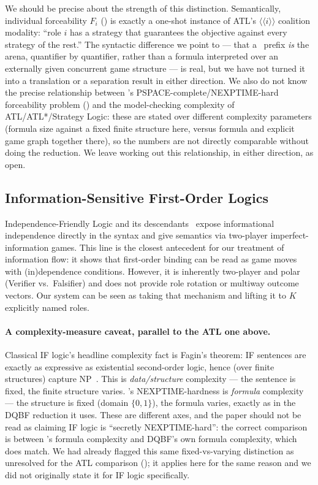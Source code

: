 We should be precise about the strength of this distinction. Semantically, individual forceability $F_i$ () is exactly a one-shot instance of ATL's $\langle\!\langle i \rangle\!\rangle$ coalition modality: ``role $i$ has a strategy that guarantees the objective against every strategy of the rest.'' The syntactic difference we point to --- that a \KFOL\ prefix \emph{is} the arena, quantifier by quantifier, rather than a formula interpreted over an externally given concurrent game structure --- is real, but we have not turned it into a translation or a separation result in either direction. We also do not know the precise relationship between \KFOL's PSPACE-complete/NEXPTIME-hard forceability problem () and the model-checking complexity of ATL/ATL*/Strategy Logic: these are stated over different complexity parameters (formula size against a fixed finite structure here, versus formula and explicit game graph together there), so the numbers are not directly comparable without doing the reduction. We leave working out this relationship, in either direction, as open.

\subsection{Information-Sensitive First-Order Logics}
Independence-Friendly Logic and its descendants~\cite{HintikkaSandu1989,Hintikka1996POMR,MannSanduSevenster2011IFL,sep-logic-if} expose informational independence directly in the syntax and give semantics via two-player imperfect-information games.
This line is the closest antecedent for our treatment of information flow: it shows that first-order binding can be read as game moves with (in)dependence conditions.
However, it is inherently two-player and polar (Verifier vs.\ Falsifier) and does not provide role rotation or multiway outcome vectors.
Our system can be seen as taking that mechanism and lifting it to $K$ explicitly named roles.

\paragraph{A complexity-measure caveat, parallel to the ATL one above.}
Classical IF logic's headline complexity fact is Fagin's theorem: IF sentences
are exactly as expressive as existential second-order logic, hence (over
finite structures) capture NP~\cite{Fagin1974GeneralizedSpectra,sep-logic-if}.
This is \emph{data/structure} complexity --- the sentence is fixed, the
finite structure varies. 's NEXPTIME-hardness is
\emph{formula} complexity --- the structure is fixed (domain $\{0,1\}$), the
formula varies, exactly as in the DQBF reduction it uses. These are different
axes, and the paper should not be read as claiming IF logic is ``secretly
NEXPTIME-hard'': the correct comparison is between \KFOL's formula complexity
and DQBF's own formula complexity, which does match. We had already flagged
this same fixed-vs-varying distinction as unresolved for the ATL comparison
(); it applies here for the same reason and we did not
originally state it for IF logic specifically.

